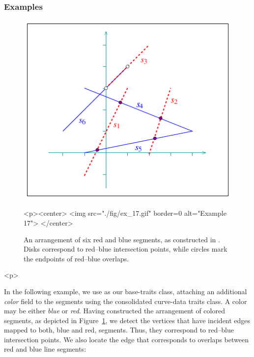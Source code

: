 \subsubsection{Examples}
%
\begin{figure}[!htp]
\begin{ccTexOnly}
  \begin{center}
  \includegraphics{Arrangement_2/fig/ex_17}
  \end{center}
\end{ccTexOnly}
\begin{ccHtmlOnly}
  <p><center>
  <img src="./fig/ex_17.gif" border=0 alt="Example 17">
  </center>
\end{ccHtmlOnly}
\caption{An arrangement of six red and blue segments, as
constructed in . Disks correspond to
red--blue intersection points, while circles mark the endpoints
of red--blue overlaps.}
\label{arr_fig:ex_17}
\end{figure}

\begin{ccHtmlOnly}<p>\end{ccHtmlOnly}
In the following example, we use  as our
base-traits class, attaching an additional {\em color} field to
the segments using the consolidated curve-data traits class. A
color may be either {\em blue} or {\em red}. Having constructed
the arrangement of colored segments, as depicted in
Figure~\ref{arr_fig:ex_17}, we detect the vertices that have incident 
edges mapped to both, blue and red, segments. Thus, they correspond
to red--blue intersection points. We also locate the edge that
corresponds to overlaps between red and blue line segments:

